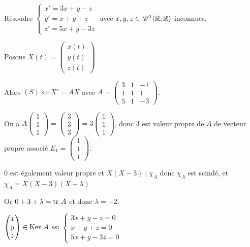 \begin{exemple}
    Résoudre $\begin{cases}
        x' = 3x + y - z \\
        y' = x + y + z \\
        z' = 5x + y - 3z
    \end{cases}$ avec $x, y, z \in \,\mathscr C^{1} (\mathbb{R}, \mathbb{R})$ inconnues. 

    Posons $X(t) = \begin{pmatrix}
    x(t) \\ y(t) \\ z(t)
    \end{pmatrix}$

    Alors $(S) \Leftrightarrow X' = AX$ avec $A = \begin{pmatrix}
    3 & 1 & -1 \\
    1 & 1 & 1 \\
    5 & 1 & -3
    \end{pmatrix}$.

    On a $A \begin{pmatrix}
    1 \\ 1 \\ 1
    \end{pmatrix} = \begin{pmatrix}
    3 \\ 3 \\ 3
    \end{pmatrix} = 3 \begin{pmatrix}
    1 \\ 1 \\ 1
    \end{pmatrix}$, donc $3$ est valeur propre de $A$ de vecteur propre associé $E_1 = \begin{pmatrix}
    1 \\ 1 \\ 1
    \end{pmatrix}$.

    $0$ est également valeur propre et $X (X - 3) \mid \chi_A$ donc 
    $\chi_A$ est scindé, et $\chi_A = X (X - 3)(X - \lambda)$

    Or $0 + 3 + \lambda = \operatorname{tr} \, A$ et donc $\lambda = -2$. 

    $\begin{pmatrix}
        x \\ y \\ z
    \end{pmatrix} \in \operatorname{Ker} \, A$ ssi $\begin{cases}
        3x + y - z = 0 \\
        x + y + z = 0 \\
        5x + y - 3z = 0
    \end{cases}$


\end{exemple}
